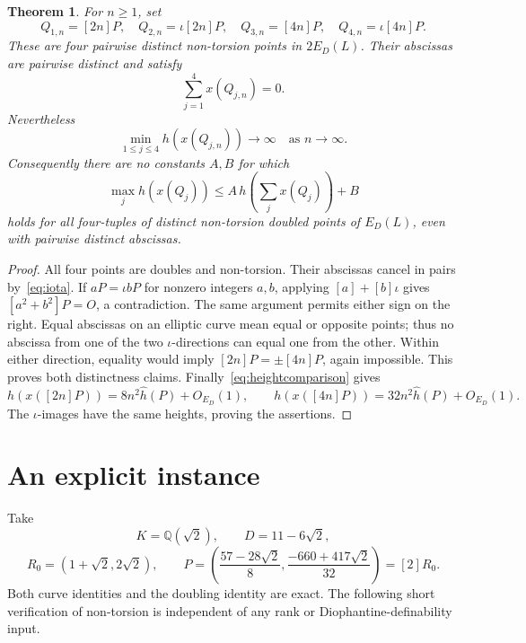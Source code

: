 \documentclass[11pt,a4paper]{article}
\newtheorem{theorem}{Theorem}[section]
\newcommand{\Q}{\mathbb Q}\newcommand{\Z}{\mathbb Z}
\begin{document}
\begin{theorem}\label{thm:sum}
For $n\ge1$, set
\[
 Q_{1,n}=[2n]P,\quad Q_{2,n}=\iota[2n]P,\quad
 Q_{3,n}=[4n]P,\quad Q_{4,n}=\iota[4n]P.
\]
These are four pairwise distinct non-torsion points in $2E_D(L)$.
Their abscissas are pairwise distinct and satisfy
\begin{equation}\label{eq:sumzero}
                       \sum_{j=1}^4x(Q_{j,n})=0.
\end{equation}
Nevertheless
\[
 \min_{1\le j\le4}h(x(Q_{j,n}))\longrightarrow\infty
                         \quad\text{as }n\longrightarrow\infty.
\]
Consequently there are no constants $A,B$ for which
\[
 \max_jh(x(Q_j))\le A\,h\!\left(\sum_jx(Q_j)\right)+B
\]
holds for all four-tuples of distinct non-torsion doubled points
of $E_D(L)$, even with pairwise distinct abscissas.
\end{theorem}
\begin{proof}
All four points are doubles and non-torsion. Their abscissas cancel
in pairs by~\eqref{eq:iota}.
If $aP=\iota bP$ for nonzero integers $a,b$, applying
$[a]+[b]\iota$ gives $[a^2+b^2]P=O$, a contradiction.
The same argument permits either sign on the right. Equal
abscissas on an elliptic curve mean equal or opposite points;
thus no abscissa from one of the two $\iota$-directions can equal
one from the other. Within either direction, equality would imply
$[2n]P=\pm[4n]P$, again impossible. This proves both distinctness
claims.
Finally~\eqref{eq:heightcomparison} gives
\[
 h(x([2n]P))=8n^2\widehat h(P)+O_{E_D}(1),\qquad
 h(x([4n]P))=32n^2\widehat h(P)+O_{E_D}(1).
\]
The $\iota$-images have the same heights, proving the assertions.
\end{proof}

\section{An explicit instance}

Take
\[
 K=\Q(\sqrt2),\qquad D=11-6\sqrt2,
\]
\[
 R_0=(1+\sqrt2,2\sqrt2),\qquad
 P=\left(\frac{57-28\sqrt2}{8},
          \frac{-660+417\sqrt2}{32}\right)=[2]R_0.
\]
Both curve identities and the doubling identity are exact.
The following short verification of non-torsion is independent
of any rank or Diophantine-definability input.
\end{document}
